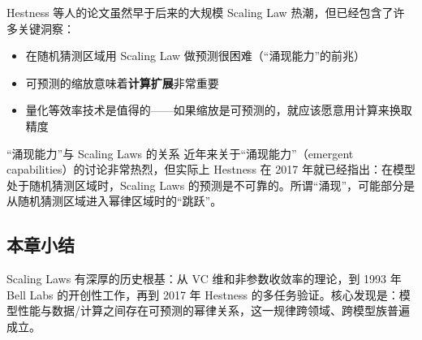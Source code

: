 Hestness 等人的论文虽然早于后来的大规模 Scaling Law 热潮，但已经包含了许多关键洞察：
\begin{itemize}
    \item 在随机猜测区域用 Scaling Law 做预测很困难（``涌现能力''的前兆）
    \item 可预测的缩放意味着\textbf{计算扩展}非常重要
    \item 量化等效率技术是值得的——如果缩放是可预测的，就应该愿意用计算来换取精度
\end{itemize}

\begin{warningbox}{``涌现能力''与 Scaling Laws 的关系}
近年来关于``涌现能力''（emergent capabilities）的讨论非常热烈，但实际上 Hestness 在 2017 年就已经指出：在模型处于随机猜测区域时，Scaling Laws 的预测是不可靠的。所谓``涌现''，可能部分是从随机猜测区域进入幂律区域时的``跳跃''。
\end{warningbox}

\subsection{本章小结}

Scaling Laws 有深厚的历史根基：从 VC 维和非参数收敛率的理论，到 1993 年 Bell Labs 的开创性工作，再到 2017 年 Hestness 的多任务验证。核心发现是：模型性能与数据/计算之间存在可预测的幂律关系，这一规律跨领域、跨模型族普遍成立。


